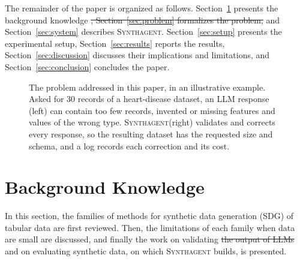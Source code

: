 \documentclass[conference]{IEEEtran}
\newcommand{\system}{\textsc{Synthagent}\xspace}
\providecommand{\DIFaddtex}[1]{{\protect\color{blue}\uwave{#1}}} %
\providecommand{\DIFdeltex}[1]{{\protect\color{red}\sout{#1}}}                      %
\providecommand{\DIFaddbegin}{} %
\providecommand{\DIFaddend}{} %
\providecommand{\DIFdelbegin}{} %
\providecommand{\DIFdelend}{} %
\providecommand{\DIFadd}[1]{\texorpdfstring{\DIFaddtex{#1}}{#1}} %
\providecommand{\DIFdel}[1]{\texorpdfstring{\DIFdeltex{#1}}{}} %
\newcommand{\DIFscaledelfig}{0.5}
\newlength{\DIFdelgraphicswidth} %
\newlength{\DIFdelgraphicsheight} %
\newcommand{\DIFaddincludegraphics}[2][]{{\color{blue}\fbox{\DIFOincludegraphics[#1]{#2}}}} %
\newcommand{\DIFdelincludegraphics}[2][]{%
\sbox{\DIFdelgraphicsbox}{\DIFOincludegraphics[#1]{#2}}%
\settoboxwidth{\DIFdelgraphicswidth}{\DIFdelgraphicsbox} %
\settoboxtotalheight{\DIFdelgraphicsheight}{\DIFdelgraphicsbox} %
\scalebox{\DIFscaledelfig}{%
\parbox[b]{\DIFdelgraphicswidth}{\usebox{\DIFdelgraphicsbox}\\[-\baselineskip] \rule{\DIFdelgraphicswidth}{0em}}\llap{\resizebox{\DIFdelgraphicswidth}{\DIFdelgraphicsheight}{%
\setlength{\unitlength}{\DIFdelgraphicswidth}%
\begin{picture}(1,1)%
\thicklines\linethickness{2pt} %
{\color[rgb]{1,0,0}\put(0,0){\framebox(1,1){}}}%
{\color[rgb]{1,0,0}\put(0,0){\line( 1,1){1}}}%
{\color[rgb]{1,0,0}\put(0,1){\line(1,-1){1}}}%
\end{picture}%
}\hspace*{3pt}}} %
} %
\DeclareRobustCommand{\DIFaddbegin}{\DIFOaddbegin \let\includegraphics\DIFaddincludegraphics} %
\DeclareRobustCommand{\DIFaddend}{\DIFOaddend \let\includegraphics\DIFOincludegraphics} %
\DeclareRobustCommand{\DIFdelbegin}{\DIFOdelbegin \let\includegraphics\DIFdelincludegraphics} %
\DeclareRobustCommand{\DIFdelend}{\DIFOaddend \let\includegraphics\DIFOincludegraphics} %
\begin{document}
The remainder of the paper is organized as follows. Section~\ref{sec:related} presents the background knowledge \DIFdelbegin \DIFdel{, Section~\ref{sec:problem} formalizes the problem, }\DIFdelend and Section~\ref{sec:system} describes \system. Section~\ref{sec:setup} presents the experimental setup, Section~\ref{sec:results} reports the results, Section~\ref{sec:discussion} discusses their implications and limitations, and Section~\ref{sec:conclusion} concludes the paper.

\begin{figure}[t]
\centering
\resizebox{\columnwidth}{!}{}
\caption{The problem addressed in this paper, in an illustrative example. Asked for 30 records of a heart-disease dataset, an LLM response (left) can contain too few records, invented or missing features and values of the wrong type. \system (right) validates and corrects every response, so the resulting dataset has the requested size and schema, and a log records each correction and its cost.}
\label{fig:teaser}
\end{figure}

\section{Background Knowledge}
\label{sec:related}
In this section, the families of methods for synthetic data generation (SDG) of tabular data are first reviewed. Then, the limitations of each family when data are small are discussed, and finally the work on validating \DIFdelbegin \DIFdel{the output of LLMs }\DIFdelend \DIFaddbegin \DIFadd{generated data }\DIFaddend and on evaluating synthetic data, on which \system builds, is presented.
\end{document}
